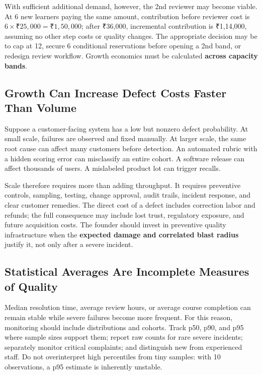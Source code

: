 With sufficient additional demand, however, the 2nd reviewer may become viable. At 6 new learners paying the same amount, contribution before reviewer cost is $6 \times \text{₹}25,000 = \text{₹}1,50,000$; after ₹36,000, incremental contribution is ₹1,14,000, assuming no other step costs or quality changes. The appropriate decision may be to cap at 12, secure 6 conditional reservations before opening a 2nd band, or redesign review workflow. Growth economics must be calculated \textbf{across capacity bands}.

\subsection{Growth Can Increase Defect Costs Faster Than Volume}
\label{sec:defect_costs_faster_than_volume}

Suppose a customer-facing system has a low but nonzero defect probability. At small scale, failures are observed and fixed manually. At larger scale, the same root cause can affect many customers before detection. An automated rubric with a hidden scoring error can misclassify an entire cohort. A software release can affect thousands of users. A mislabeled product lot can trigger recalls.

Scale therefore requires more than adding throughput. It requires preventive controls, sampling, testing, change approval, audit trails, incident response, and clear customer remedies. The direct cost of a defect includes correction labor and refunds; the full consequence may include lost trust, regulatory exposure, and future acquisition costs. The founder should invest in preventive quality infrastructure when the \textbf{expected damage and correlated blast radius} justify it, not only after a severe incident.

\subsection{Statistical Averages Are Incomplete Measures of Quality}
\label{sec:statistical_averages_incomplete}

Median resolution time, average review hours, or average course completion can remain stable while severe failures become more frequent. For this reason, monitoring should include distributions and cohorts. Track p50, p90, and p95 where sample sizes support them; report raw counts for rare severe incidents; separately monitor critical complaints; and distinguish new from experienced staff. Do not overinterpret high percentiles from tiny samples: with 10 observations, a p95 estimate is inherently unstable.

